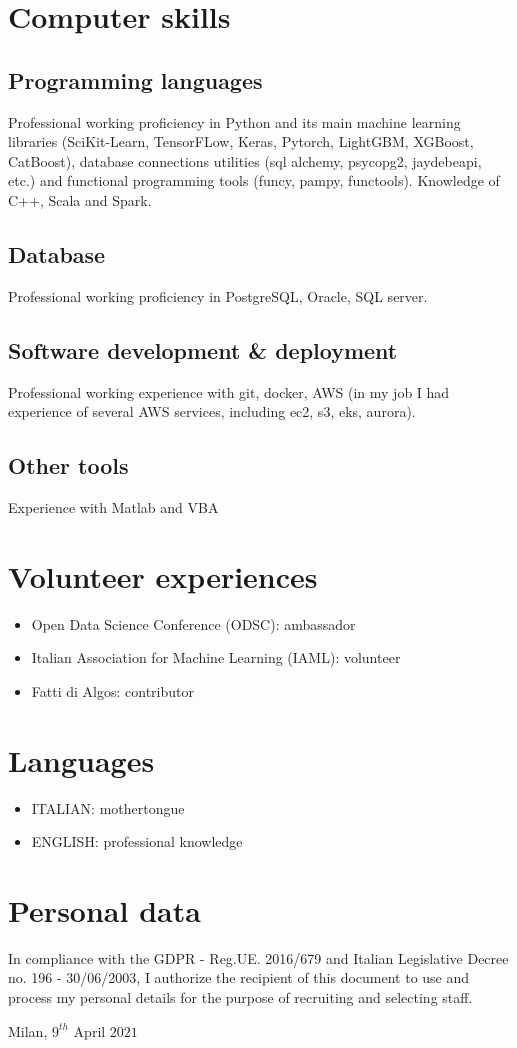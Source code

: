 \documentclass[11pt,a4paper,sans]{moderncv}        %
\begin{document}
\section{Computer skills}
\subsection{Programming languages}
Professional working proficiency in Python and its main machine learning libraries (SciKit-Learn, TensorFLow, Keras, Pytorch, LightGBM, XGBoost, CatBoost), database connections utilities (sql alchemy, psycopg2, jaydebeapi, etc.) and functional programming tools (funcy, pampy, functools). Knowledge of C++, Scala and Spark.
\subsection{Database}
Professional working proficiency in PostgreSQL, Oracle, SQL server.
\subsection{Software development \& deployment}
Professional working experience with git, docker, AWS (in my job I had experience of several AWS services, including ec2, s3, eks, aurora).
\subsection{Other tools}
Experience with Matlab and VBA

\section{Volunteer experiences}
\begin{itemize}
 \item Open Data Science Conference (ODSC): ambassador
 \item Italian Association for Machine Learning (IAML): volunteer
 \item Fatti di Algos: contributor
\end{itemize} 

\section{Languages}
\begin{itemize}
 \item ITALIAN: mothertongue
 \item ENGLISH: professional knowledge
\end{itemize} 

\section{Personal data}
In compliance with the GDPR - Reg.UE. 2016/679 and Italian Legislative Decree no. 196 - 30/06/2003, I authorize the recipient of this document to use and process my personal details for the purpose of recruiting and selecting staff. 

\bigskip
\bigskip
Milan, $9^{th}$ April $2021$
\end{document}

